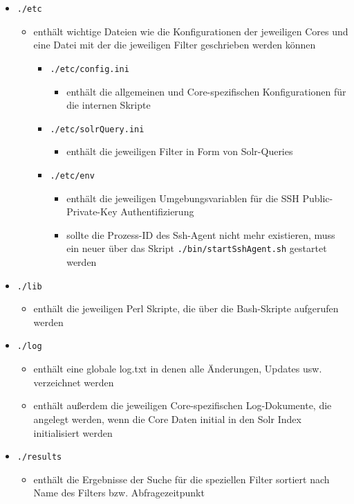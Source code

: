 \documentclass[10pt]{article}
\begin{document}
\begin{itemize}
	\item[] \texttt{./etc}
	\begin{itemize}
		\item enthält wichtige Dateien wie die Konfigurationen der jeweiligen Cores und eine Datei mit der die jeweiligen Filter geschrieben werden können
		\begin{itemize}
			\item[] \texttt{./etc/config.ini}
			\begin{itemize}
				\item enthält die allgemeinen und Core-spezifischen Konfigurationen für die internen Skripte
			\end{itemize}
		\end{itemize}
		\begin{itemize}
			\item[] \texttt{./etc/solrQuery.ini}
			\begin{itemize}
				\item enthält die jeweiligen Filter in Form von Solr-Queries
			\end{itemize}
		\end{itemize}
		\begin{itemize}
			\item[] \texttt{./etc/env}
			\begin{itemize}
				\item enthält die jeweiligen Umgebungsvariablen für die SSH Public-Private-Key Authentifizierung
				\item sollte die Prozess-ID des Ssh-Agent nicht mehr existieren, muss ein neuer über das Skript \texttt{./bin/startSshAgent.sh} gestartet werden
			\end{itemize}
		\end{itemize}
	\end{itemize}

	\item[] \texttt{./lib}
	\begin{itemize}
		\item enthält die jeweiligen Perl Skripte, die über die Bash-Skripte aufgerufen werden
	\end{itemize}

	\item[] \texttt{./log}
	\begin{itemize}
		\item enthält eine globale log.txt in denen alle Änderungen, Updates usw. verzeichnet werden
		\item enthält außerdem die jeweiligen Core-spezifischen Log-Dokumente, die angelegt werden, wenn die Core Daten initial in den Solr Index initialisiert werden
	\end{itemize}

	\item[] \texttt{./results}
	\begin{itemize}
		\item enthält die Ergebnisse der Suche für die speziellen Filter sortiert nach Name des Filters bzw. Abfragezeitpunkt
	\end{itemize}

\end{itemize}
\end{document}
